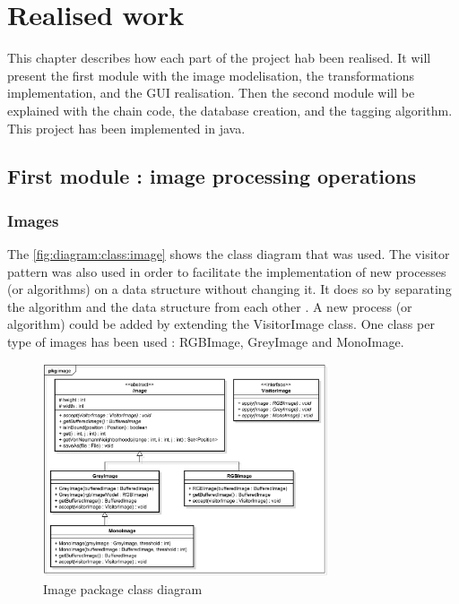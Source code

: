 \chapter{Realised work}


This chapter describes how each part of the project hab been realised. It will present the first module with the image modelisation, the transformations implementation, and the \gls{GUI} realisation. Then the second module will be explained with the chain code, the database creation, and the tagging algorithm. This project has been implemented in java.


\section{First module : image processing operations}


\subsection{Images}


The \vref{fig:diagram:class:image} shows the class diagram that was used. The visitor pattern was also used in order to facilitate the implementation of new processes (or algorithms) on a data structure without changing it. It does so by separating the algorithm and the data structure from each other  \cite{bib:pattern:Visitor}. A new process (or algorithm) could be added by extending the VisitorImage class. One class per type of images has been used : RGBImage, GreyImage and MonoImage. 

\begin{figure}[H]
	\centering 
	\includegraphics[width=0.75\textwidth]{images/diagrams/class_diagram_image}
	\caption{Image package class diagram}
	\label{fig:diagram:class:image}
\end{figure}



